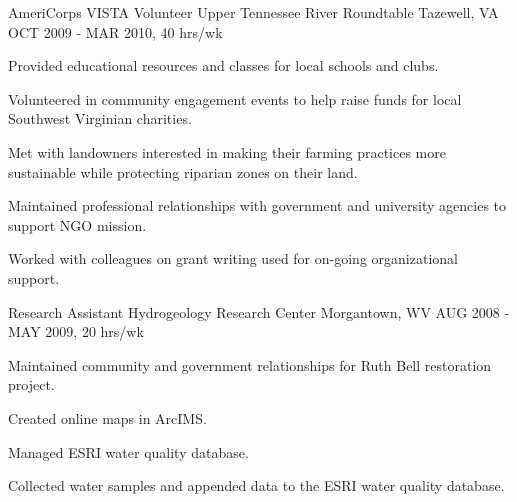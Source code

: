 \begin{cventries}

\cventry
{AmeriCorps VISTA Volunteer} %
{Upper Tennessee River Roundtable} %
{Tazewell, VA} %
{OCT 2009 - MAR 2010, 40 hrs/wk} %
{ %
\begin{cvitems}
\item {Provided educational resources and classes for local schools and clubs.}
\item {Volunteered in community engagement events to help raise funds for local Southwest Virginian charities.}
\item {Met with landowners interested in making their farming practices more sustainable while protecting riparian zones on their land.}
\item {Maintained professional relationships with government and university agencies to support NGO mission.}
\item {Worked with colleagues on grant writing used for on-going organizational support.}
\end{cvitems}
}


\cventry
{Research Assistant} %
{Hydrogeology Research Center} %
{Morgantown, WV} %
{AUG 2008 - MAY 2009, 20 hrs/wk} %
{ %
\begin{cvitems}
\item {Maintained community and government relationships for Ruth Bell restoration project.}
\item {Created online maps in ArcIMS.}
\item {Managed ESRI water quality database.}
\item {Collected water samples and appended data to the ESRI water quality database.}
\end{cvitems}
}



\end{cventries}

